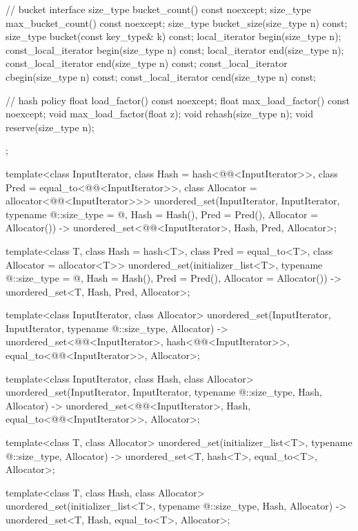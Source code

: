 \begin{codeblock}
{{    // bucket interface
    size_type bucket_count() const noexcept;
    size_type max_bucket_count() const noexcept;
    size_type bucket_size(size_type n) const;
    size_type bucket(const key_type& k) const;
    local_iterator begin(size_type n);
    const_local_iterator begin(size_type n) const;
    local_iterator end(size_type n);
    const_local_iterator end(size_type n) const;
    const_local_iterator cbegin(size_type n) const;
    const_local_iterator cend(size_type n) const;

    // hash policy
    float load_factor() const noexcept;
    float max_load_factor() const noexcept;
    void max_load_factor(float z);
    void rehash(size_type n);
    void reserve(size_type n);
  };

  template<class InputIterator,
           class Hash = hash<@@<InputIterator>>,
           class Pred = equal_to<@@<InputIterator>>,
           class Allocator = allocator<@@<InputIterator>>>
    unordered_set(InputIterator, InputIterator, typename @\seebelow@::size_type = @\seebelow@,
                  Hash = Hash(), Pred = Pred(), Allocator = Allocator())
      -> unordered_set<@@<InputIterator>,
                       Hash, Pred, Allocator>;

  template<class T, class Hash = hash<T>,
           class Pred = equal_to<T>, class Allocator = allocator<T>>
    unordered_set(initializer_list<T>, typename @\seebelow@::size_type = @\seebelow@,
                  Hash = Hash(), Pred = Pred(), Allocator = Allocator())
      -> unordered_set<T, Hash, Pred, Allocator>;

  template<class InputIterator, class Allocator>
    unordered_set(InputIterator, InputIterator, typename @\seebelow@::size_type, Allocator)
      -> unordered_set<@@<InputIterator>,
                       hash<@@<InputIterator>>,
                       equal_to<@@<InputIterator>>,
                       Allocator>;

  template<class InputIterator, class Hash, class Allocator>
    unordered_set(InputIterator, InputIterator, typename @\seebelow@::size_type,
                  Hash, Allocator)
      -> unordered_set<@@<InputIterator>, Hash,
                       equal_to<@@<InputIterator>>,
                       Allocator>;

  template<class T, class Allocator>
    unordered_set(initializer_list<T>, typename @\seebelow@::size_type, Allocator)
      -> unordered_set<T, hash<T>, equal_to<T>, Allocator>;

  template<class T, class Hash, class Allocator>
    unordered_set(initializer_list<T>, typename @\seebelow@::size_type, Hash, Allocator)
      -> unordered_set<T, Hash, equal_to<T>, Allocator>;
}
\end{codeblock}

